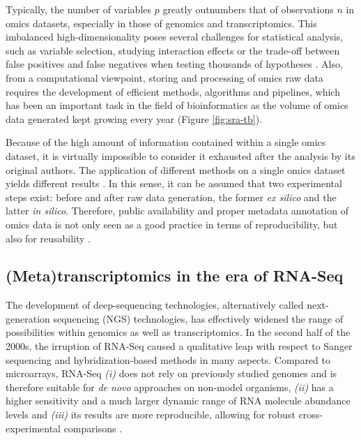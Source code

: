\documentclass[
  openany]{book}
\begin{document}
Typically, the number of variables \(p\) greatly outnumbers that of observations \(n\) in omics datasets, especially in those of genomics and transcriptomics. This imbalanced high-dimensionality poses several challenges for statistical analysis, such as variable selection, studying interaction effects or the trade-off between false positives and false negatives when testing thousands of hypotheses \autocite{Korthauer2019,Yamada2020}. Also, from a computational viewpoint, storing and processing of omics raw data requires the development of efficient methods, algorithms and pipelines, which has been an important task in the field of bioinformatics \autocite{Berger2013} as the volume of omics data generated kept growing every year (Figure \ref{fig:sra-tb}).

Because of the high amount of information contained within a single omics dataset, it is virtually impossible to consider it exhausted after the analysis by its original authors. The application of different methods on a single omics dataset yields different results \autocite{Yamada2020}. In this sense, it can be assumed that two experimental steps exist: before and after raw data generation, the former \emph{ex silico} and the latter \emph{in silico}. Therefore, public availability and proper metadata annotation of omics data is not only seen as a good practice in terms of reproducibility, but also for reusability \autocite{Perez-Riverol2019}.

\hypertarget{metatranscriptomics-in-the-era-of-rna-seq}{%
\subsection{(Meta)transcriptomics in the era of RNA-Seq}\label{metatranscriptomics-in-the-era-of-rna-seq}}

The development of deep-sequencing technologies, alternatively called next-generation sequencing (NGS) technologies, has effectively widened the range of possibilities within genomics as well as transcriptomics. In the second half of the 2000s, the irruption of RNA-Seq caused a qualitative leap with respect to Sanger sequencing and hybridization-based methods in many aspects. Compared to microarrays, RNA-Seq \emph{(i)} does not rely on previously studied genomes and is therefore suitable for \emph{de novo} approaches on non-model organisms, \emph{(ii)} has a higher sensitivity and a much larger dynamic range of RNA molecule abundance levels and \emph{(iii)} its results are more reproducible, allowing for robust cross-experimental comparisons \autocite{Wang2009}.
\end{document}
